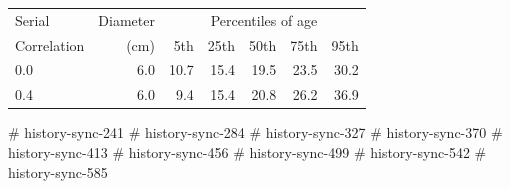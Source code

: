 \begin{tabular}{|l|r||r|r|r|r|r|}
\hline
Serial       & Diameter   & \multicolumn{5}{c|}{Percentiles of age} \\
Correlation  & (cm)       & 5th & 25th & 50th & 75th & 95th \\
\hline
0.0 & 6.0 & 10.7  & 15.4  & 19.5  & 23.5  & 30.2 \\
0.4 & 6.0 & 9.4  & 15.4  & 20.8  & 26.2  & 36.9 \\
\hline
\end{tabular}
# history-sync-241
# history-sync-284
# history-sync-327
# history-sync-370
# history-sync-413
# history-sync-456
# history-sync-499
# history-sync-542
# history-sync-585
